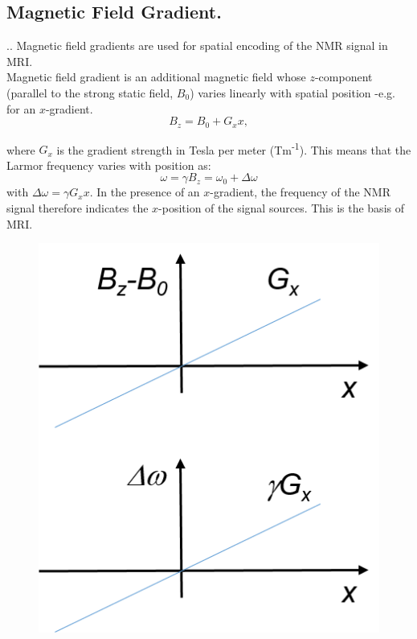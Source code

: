 \documentclass[handout]{beamer}
\begin{document}
\subsection{Magnetic Field Gradient.}
\begin{frame}{\thesection.\thesubsection. \insertsubsection}
    Magnetic field gradients are used for spatial encoding of the NMR signal in MRI.\\
    Magnetic field gradient is an additional magnetic field whose $z$-component (parallel to the strong static field, $B_0$) varies linearly with spatial position -e.g. for an $x$-gradient.
    \begin{equation}
     B_z = B_0 + G_x x,
    \end{equation}
    \begin{minipage}{0.7\textwidth}
		  where $G_x$ is the gradient strength in Tesla per meter (Tm\textsuperscript{-1}). This means that the Larmor frequency varies with position as:
		\begin{equation}
		\omega = \gamma B_z = \omega_0 + \Delta \omega
		\end{equation}
		with $\Delta \omega = \gamma G_x x$.
		In the presence of an $x$-gradient, the frequency of the NMR signal therefore indicates the $x$-position of the signal sources. This is the basis of MRI.
    \end{minipage}
    \begin{minipage}{0.27\textwidth}
	    \begin{figure}
		\centering
		\includegraphics[scale=0.4]{figures/magnetic_field_gradient1.png}
	    \end{figure}
    \end{minipage}

    
\end{frame}
\end{document}
